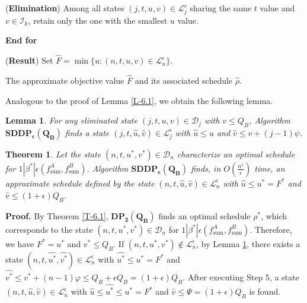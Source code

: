 \documentclass[12pt]{article}
\newtheorem{theorem}{Theorem}[section]
\newtheorem{lemma}{Lemma}[section]
\begin{document}
\begin{sloppypar}
\begin{description}
\quad (\textbf{Elimination}) Among all states $(j, t, u, v) \in \mathcal{L}_{j}^{\epsilon}$ sharing the same $t$ value and $v \in \mathcal{I}_k$, retain only the one with the smallest $u$ value.

\textbf{End for}

\item [Step 5.] (\textbf{Result}) Set $\widehat{F}=\min\{u: (n, t, u, v) \in \mathcal{L}_n^{\epsilon}\}$.

\item [Output:] The approximate objective value $\widehat{F}$ and its associated schedule $\widehat{\rho}$.
\end{description}

Analogous to the proof of Lemma \ref{L-6.1}, we obtain the following lemma.  

\begin{lemma} \label{L-6.4}
For any eliminated state $(j, t, u, v) \in \mathcal{D}_j$ with $v \leq Q_B$,
Algorithm $\mathbf{SDDP_{\epsilon}(Q_B)}$ finds a state
$(j, t, \widehat{u}, \widehat{v}) \in \mathcal{L}_j^{\epsilon}$ with $\widehat{u} \leq u$ and $\widehat{v} \leq v+(j-1) \psi$.
\end{lemma}

\begin{theorem} \label{T-6.4}
Let the state $(n, t, u^{*}, v^{*}) \in \mathcal{D}_n$ characterize an optimal schedule for $1 | \beta^{*}|\epsilon(f_{\mathrm{sum}}^A, f_{\mathrm{sum}}^B)$.
Algorithm $\mathbf{SDDP_{\epsilon}(Q_B)}$ finds, in $O(\frac{n^5}{\epsilon})$ time,
an approximate schedule defined by the state $(n, t, \widehat{u}, \widehat{v}) \in \mathcal{L}_n^{\epsilon}$
with $\widehat{u} \leq  u^{*}= F^{*}$ and $\widehat{v} \leq (1+\epsilon) Q_B$.
\end{theorem}

\noindent\textbf{Proof.} By Theorem \ref{T-6.1}, $\mathbf{DP_2(Q_B)}$ finds an optimal schedule $\rho^{*}$, which corresponds to the state $(n, t, u^{*}, v^{*}) \in \mathcal{D}_n$ for $1 | \beta^{*}|\epsilon(f_{\mathrm{sum}}^A, f_{\mathrm{sum}}^B)$. Therefore, we have $F^{*}=u^{*}$ and $v^{*} \leq Q_B$. If $(n, t, u^{*}, v^{*}) \notin \mathcal{L}_n^{\epsilon}$, by Lemma \ref{L-6.4}, there exists a state $(n, t, \widehat{u^{*}}, \widehat{v^{*}}) \in \mathcal{L}_n^{\epsilon}$ with
$\widehat{u^{*}} \leq u^{*} =F^{*}$ and $\widehat{v^{*}} \leq v^{*} +(n-1)\varphi \leq Q_B+\epsilon Q_B=(1+\epsilon)Q_B$. After executing Step 5, a state
$(n, t, \widehat{u}, \widehat{v}) \in \mathcal{L}_n^{\epsilon}$ with $\widehat{u} \leq \widehat{u^{*}} \leq u^{*} =F^{*}$ and $\widehat{v} \leq \Psi=(1+\epsilon)Q_B$ is found. 


\end{sloppypar}
\end{document}
